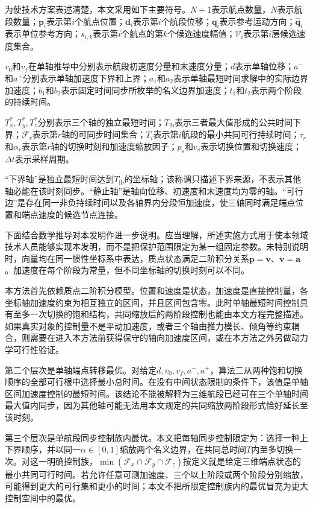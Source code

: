 \documentclass[UTF8,a4paper,12pt,fontset=fandol]{ctexart}
\begin{document}
为使技术方案表述清楚，本文采用如下主要符号。\(N+1\)表示航点数量，\(N\)表示航段数量；\(\mathbf p_i\)表示第\(i\)个航点位置；\(\mathbf d_i\)表示第\(i\)个航段位移；\(\mathbf q_i\)表示参考运动方向；\(\widehat{\mathbf q}_i\)表示单位参考方向；\(s_{i,k}\)表示第\(i\)个航点的第\(k\)个候选速度幅值；\(\mathcal V_i\)表示第\(i\)层候选速度集合。

\(v_0\)和\(v_f\)在单轴推导中分别表示航段初速度分量和末速度分量；\(d\)表示单轴位移；\(a^-\)和\(a^+\)分别表示单轴加速度下界和上界；\(a_1\)和\(a_2\)表示单轴最短时间求解中的实际边界加速度；\(b_1\)和\(b_2\)表示固定时间同步所枚举的名义边界加速度；\(t_1\)和\(t_2\)表示两个阶段的持续时间。

\(T_x^*,T_y^*,T_z^*\)分别表示三个轴的独立最短时间；\(T_{\mathrm{lb}}\)表示三者最大值形成的公共时间下界；\(\mathcal F_r\)表示第\(r\)轴的可同步时间集合；\(T_i\)表示第\(i\)航段的最小共同可行持续时间；\(\tau_r\)和\(\alpha_r\)表示第\(r\)轴的切换时刻和加速度缩放因子；\(p_s\)和\(v_s\)表示切换位置和切换速度；\(\Delta t\)表示采样周期。

“下界轴”是独立最短时间达到\(T_{\mathrm{lb}}\)的坐标轴；该称谓只描述下界来源，不表示其他轴必能在该时刻同步。“静止轴”是轴向位移、初速度和末速度均为零的轴。“可行边”是存在同一非负持续时间以及各轴界内分段恒加速度，使三轴同时满足端点位置和端点速度的候选节点连接。

下面结合数学推导对本发明作进一步说明。应当理解，所述实施方式用于使本领域技术人员能够实现本发明，而不是把保护范围限定为某一组固定参数。未特别说明时，向量均在同一惯性坐标系中表达，质点状态满足二阶积分关系\(\dot{\mathbf p}=\mathbf v\)、\(\dot{\mathbf v}=\mathbf a\)。加速度在每个阶段为常量，但不同坐标轴的切换时刻可以不同。

本方法首先依赖质点二阶积分模型。位置和速度是状态，加速度是直接控制量，各坐标轴加速度约束为相互独立的区间，并且区间包含零。此时单轴最短时间控制具有至多一次切换的饱和结构，共同缩放后的两阶段控制也能由本文方程完整描述。如果真实对象的控制量不是平动加速度，或者三个轴由推力模长、倾角等约束耦合，则需要在进入本方法前获得保守的轴向加速度区间，或在本方法之外另做动力学可行性验证。

第二个层次是单轴端点转移最优。对给定\(d,v_0,v_f,a^-,a^+\)，算法二从两种饱和切换顺序的全部可行根中选择最小总时间。在没有中间状态限制的条件下，该值是单轴区间加速度控制的最短时间。该结论不能被解释为三维航段已经可在三个单轴时间最大值内同步，因为其他轴可能无法用本文规定的共同缩放两阶段形式恰好延长至该时刻。

第三个层次是单航段同步控制族内最优。本文把每轴同步控制限定为：选择一种上下界顺序，并以同一\(\alpha\in[0,1]\)缩放两个名义边界，在共同总时间\(T\)内至多切换一次。对这一明确控制族，\(\min(\mathcal F_x\cap\mathcal F_y\cap\mathcal F_z)\)按定义就是给定三维端点状态的最小共同可行时间。若允许任意可测加速度、三个以上阶段或两个阶段分别缩放，可能得到更大的可行集和更小的时间；本文不把所限定控制族内的最优冒充为更大控制空间中的最优。
\end{document}
